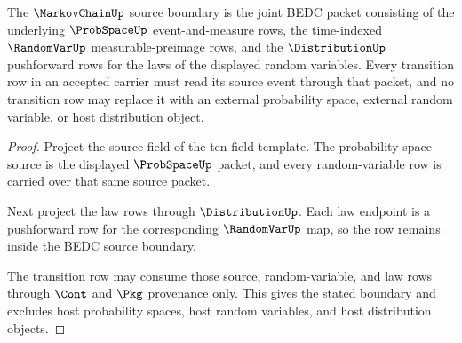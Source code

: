 \begin{theorem}
\label{thm:markovchain-probspace-randomvar-source-boundary}
The $\MarkovChainUp$ source boundary is the joint BEDC packet consisting of the underlying $\ProbSpaceUp$ event-and-measure rows, the time-indexed $\RandomVarUp$ measurable-preimage rows, and the $\DistributionUp$ pushforward rows for the laws of the displayed random variables. Every transition row in an accepted carrier must read its source event through that packet, and no transition row may replace it with an external probability space, external random variable, or host distribution object.
\end{theorem}
\begin{proof}
Project the source field of the ten-field template. The probability-space source is the displayed $\ProbSpaceUp$ packet, and every random-variable row is carried over that same source packet.

Next project the law rows through $\DistributionUp$. Each law endpoint is a pushforward row for the corresponding $\RandomVarUp$ map, so the row remains inside the BEDC source boundary.

The transition row may consume those source, random-variable, and law rows through $\Cont$ and $\Pkg$ provenance only. This gives the stated boundary and excludes host probability spaces, host random variables, and host distribution objects.
\end{proof}

